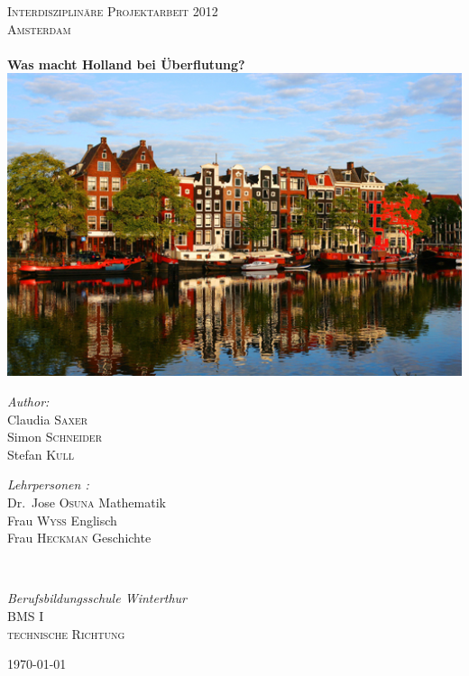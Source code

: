 
\begin{titlepage}

\begin{center}


\textsc{\LARGE Interdisziplinäre Projektarbeit 2012}\\[1.5cm]

\textsc{\Large Amsterdam}\\[0.5cm]


\HRule \\[0.4cm] 
{ \huge \bfseries Was macht Holland bei Überflutung?}
\HRule \\[0.4cm] 
\includegraphics[width=1\textwidth]{titelbild.jpg}\\[1cm]    

\begin{minipage}{0.4\textwidth}
\begin{flushleft} \large
\emph{Author:}
\\Claudia \textsc{Saxer}
\\Simon \textsc{Schneider}
\\Stefan \textsc{Kull}
\end{flushleft}
\end{minipage}
\begin{minipage}{0.5\textwidth}
\begin{flushright} \large
\emph{Lehrpersonen :} 
\\Dr.~Jose \textsc{Osuna}  \textnormal{Mathematik}
\\Frau \textsc{Wyss} \textnormal{Englisch}
\\Frau \textsc{Heckman} \textnormal{Geschichte}
\end{flushright}
\end{minipage}
\\[1.5cm]
\begin{minipage}{0.5\textwidth}
\begin{center} \large
\emph{Berufsbildungsschule Winterthur} 
\\ \textsc{BMS I}
\\ \textsc{technische Richtung }
\end{center}
\end{minipage}

\vfill

{\large \today}

\end{center}

\end{titlepage}


